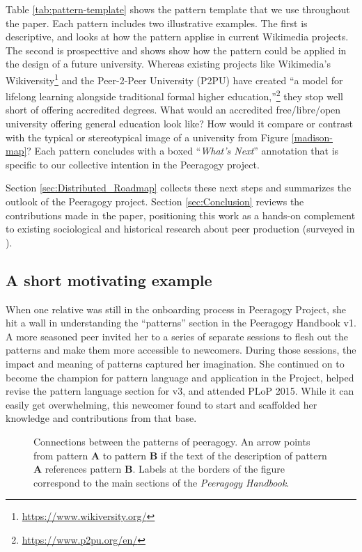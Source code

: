 Table \ref{tab:pattern-template} shows the pattern template that we use throughout the paper.  Each pattern includes two illustrative examples.  The first is descriptive, and looks at how the pattern applise in current Wikimedia projects.  The second is prospecttive and shows show how the pattern could be applied in the design of a future university.  Whereas existing projects like Wikimedia's Wikiversity\footnote{\url{https://www.wikiversity.org/}} and the Peer-2-Peer University (P2PU) have created ``a model for lifelong learning alongside traditional formal higher education,''\footnote{\url{https://www.p2pu.org/en/}} they stop well short of offering accredited degrees.  What would an accredited free/libre/open university offering general education look like?  How would it compare or contrast with the typical or stereotypical image of a university from Figure \ref{madison-map}?
Each pattern concludes with a boxed ``\emph{What's Next}'' annotation that is specific to our collective intention in the Peeragogy project.

Section \ref{sec:Distributed_Roadmap} collects these next steps and summarizes the outlook of the Peeragogy project.  Section \ref{sec:Conclusion} reviews the contributions made in the paper, positioning this work as a hands-on complement to existing sociological and historical research about peer production (surveyed in \cite{benkler2015peer}).

\subsection*{A short motivating example}
When one relative  was still in the onboarding process in Peeragogy Project, she hit a wall in understanding the ``patterns'' section in the Peeragogy Handbook v1. A more seasoned peer invited her to a series of separate sessions to flesh out the patterns and make them more accessible to newcomers. During those sessions, the impact and meaning of patterns captured her imagination. She continued on to become the champion for pattern language and application in the Project, helped revise the pattern language section for v3, and attended PLoP 2015. While it can easily get overwhelming, this newcomer found  to start and scaffolded her knowledge and contributions from that base.

\begin{figure}
\vspace{-.9in}
{\centering


\par
}
\vspace{-.9in}
\caption{Connections between the patterns of peeragogy.  An arrow points from pattern \textbf{A} to pattern \textbf{B} if the text of the description of pattern \textbf{A} references pattern \textbf{B}.  Labels at the borders of the figure correspond to the main sections of the \emph{Peeragogy Handbook}.\label{fig:connections}}
\end{figure}

